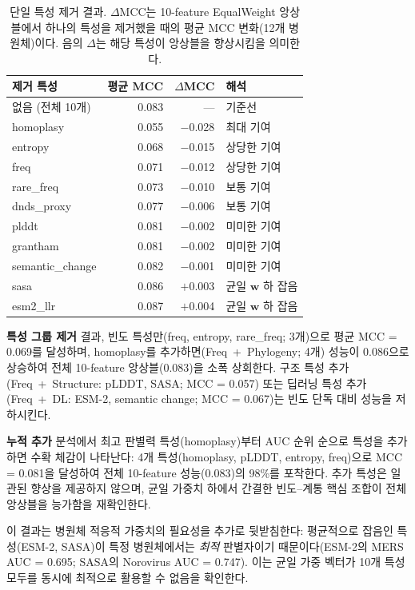 \begin{table}[htbp]
\centering
\caption{단일 특성 제거 결과. $\Delta$MCC는 10-feature EqualWeight 앙상블에서 하나의 특성을 제거했을 때의 평균 MCC 변화(12개 병원체)이다. 음의 $\Delta$는 해당 특성이 앙상블을 향상시킴을 의미한다.}
\label{tab:feature_ablation}
\footnotesize
\begin{tabular}{lrrl}
\toprule
\textbf{제거 특성} & \textbf{평균 MCC} & $\Delta$\textbf{MCC} & \textbf{해석} \\
\midrule
없음 (전체 10개)       & 0.083 & ---     & 기준선 \\
\midrule
homoplasy           & 0.055 & $-$0.028 & 최대 기여 \\
entropy             & 0.068 & $-$0.015 & 상당한 기여 \\
freq                & 0.071 & $-$0.012 & 상당한 기여 \\
rare\_freq          & 0.073 & $-$0.010 & 보통 기여 \\
dnds\_proxy         & 0.077 & $-$0.006 & 보통 기여 \\
plddt               & 0.081 & $-$0.002 & 미미한 기여 \\
grantham            & 0.081 & $-$0.002 & 미미한 기여 \\
semantic\_change    & 0.082 & $-$0.001 & 미미한 기여 \\
sasa                & 0.086 & $+$0.003 & 균일 $\mathbf{w}$ 하 잡음 \\
esm2\_llr           & 0.087 & $+$0.004 & 균일 $\mathbf{w}$ 하 잡음 \\
\bottomrule
\end{tabular}
\end{table}

\textbf{특성 그룹 제거} 결과, 빈도 특성만(freq, entropy, rare\_freq; 3개)으로 평균 MCC = 0.069를 달성하며, homoplasy를 추가하면(Freq~+~Phylogeny; 4개) 성능이 0.086으로 상승하여 전체 10-feature 앙상블(0.083)을 소폭 상회한다.
구조 특성 추가(Freq~+~Structure: pLDDT, SASA; MCC = 0.057) 또는 딥러닝 특성 추가(Freq~+~DL: ESM-2, semantic change; MCC = 0.067)는 빈도 단독 대비 성능을 저하시킨다.

\textbf{누적 추가} 분석에서 최고 판별력 특성(homoplasy)부터 AUC 순위 순으로 특성을 추가하면 수확 체감이 나타난다: 4개 특성(homoplasy, pLDDT, entropy, freq)으로 MCC = 0.081을 달성하여 전체 10-feature 성능(0.083)의 98\%를 포착한다.
추가 특성은 일관된 향상을 제공하지 않으며, 균일 가중치 하에서 간결한 빈도--계통 핵심 조합이 전체 앙상블을 능가함을 재확인한다.

이 결과는 병원체 적응적 가중치의 필요성을 추가로 뒷받침한다: 평균적으로 잡음인 특성(ESM-2, SASA)이 특정 병원체에서는 \textit{최적} 판별자이기 때문이다(ESM-2의 MERS AUC = 0.695; SASA의 Norovirus AUC = 0.747). 이는 균일 가중 벡터가 10개 특성 모두를 동시에 최적으로 활용할 수 없음을 확인한다.

